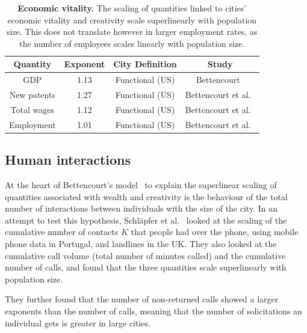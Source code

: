 \begin{table}[!h]
    \centering
\begin{tabular}{|cccc|}
\hline
Quantity & Exponent & City Definition & Study\\
\hline
GDP & 1.13 & Functional (US) & Bettencourt~\cite{Bettencourt:2013}\\
New patents & 1.27 & Functional (US) & Bettencourt et al.~\cite{Bettencourt:2007}\\ 
Total wages & 1.12 & Functional (US) & Bettencourt et al.~\cite{Bettencourt:2007}\\
\hline
Employment & 1.01 & Functional (US) & Bettencourt et
al.~\cite{Bettencourt:2007}\\
\hline
\end{tabular}
\caption{{\bf Economic vitality.} The scaling of quantities linked to cities'
economic vitality and creativity scale superlinearly with population size.
This does not translate however in larger employment rates, as the number of
employees scales linearly with population size.} 
\label{table:wealth} 
\end{table}

\subsection{Human interactions}
\label{sub:human_interactions}

At the heart of Bettencourt's model~\cite{Bettencourt:2013} to explain the
superlinear scaling of quantities associated with wealth and creativity is the
behaviour of the total number of interactions between individuals with the size
of the city. In an attempt to test this hypothesis, Schl\"apfer et
al.~\cite{Schlapfer:2014} looked at the scaling of the cumulative number of
contacts $K$ that people had over the phone, using mobile phone data in
Portugal, and landlines in the UK. They also looked at the cumulative call
volume (total number of minutes called) and the cumulative number of calls, and
found that the three quantities scale superlinearly with population size. 

They further found that the number of non-returned calls showed a larger
exponents than the number of calls, meaning that the number of solicitations an
individual gets is greater in large cities.\\


